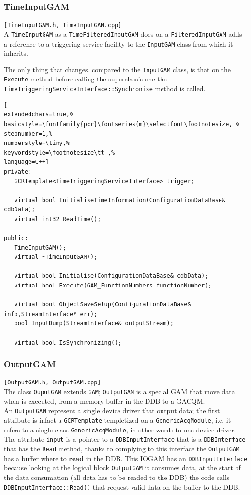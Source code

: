 \subsubsection{TimeInputGAM}
\texttt{[TimeInputGAM.h, TimeInputGAM.cpp]}\\
A \texttt{TimeInputGAM} as a \texttt{TimeFilteredInputGAM} does on a \texttt{FilteredInputGAM} adds a reference to a triggering service facility to the \texttt{InputGAM} class from which it inherits.

The only thing that changes, compared to the \texttt{InputGAM} class, is that on the \texttt{Execute} method before calling the superclass's one the \texttt{TimeTriggeringServiceInterface::Synchronise} method is called.

\begin{lstlisting}[
extendedchars=true,%
basicstyle=\fontfamily{pcr}\fontseries{m}\selectfont\footnotesize, %
stepnumber=1,%
numberstyle=\tiny,%
keywordstyle=\footnotesize\tt ,%
language=C++]
private:
   GCRTemplate<TimeTriggeringServiceInterface> trigger;

   virtual bool InitialiseTimeInformation(ConfigurationDataBase& cdbData);
   virtual int32 ReadTime();

public:
   TimeInputGAM();
   virtual ~TimeInputGAM();

   virtual bool Initialise(ConfigurationDataBase& cdbData);
   virtual bool Execute(GAM_FunctionNumbers functionNumber);

   virtual bool ObjectSaveSetup(ConfigurationDataBase& info,StreamInterface* err);
   bool InputDump(StreamInterface& outputStream);

   virtual bool IsSynchronizing();
\end{lstlisting}



\subsubsection{OutputGAM}
\texttt{[OutputGAM.h, OutputGAM.cpp]}\\
The class \texttt{OuputGAM} extends \texttt{GAM}; \texttt{OutputGAM} is a special GAM that move data, when is executed, from a memory buffer in the DDB to a GACQM. \\


An \texttt{OutputGAM} represent a single device driver that output data; the first attribute is infact a \texttt{GCRTemplate} templetized on a \texttt{GenericAcqModule}, i.e. it refers to a single class \texttt{GenericAcqModule}, in other words to one device driver. The attribute \texttt{input} is a pointer to a \texttt{DDBInputInterface} that is a \texttt{DDBInterface} that has the \texttt{Read} method, thanks to complying to this interface the \texttt{OutputGAM} has a buffer where to \textbf{read} in the DDB. This IOGAM has an \texttt{DDBInputInterface} because looking at the logical block \texttt{OutputGAM} it consumes data, at the start of the data consumation (all data has to be readed to the DDB) the code calls \texttt{DDBInputInterface::Read()} that request valid data on the buffer to the DDB.

